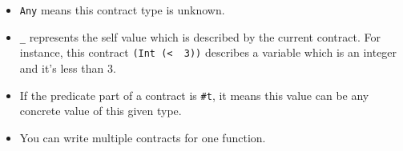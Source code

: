 \documentclass[paper=a4, fontsize=11pt]{scrartcl} %
\numberwithin{equation}{section} %
\numberwithin{figure}{section} %
\numberwithin{table}{section} %
\begin{document}
\begin{itemize}
\item \texttt{Any} means this contract type is unknown.

\item \texttt{_} represents the self value which is described by the current contract. For instance, this contract \texttt{(Int\ (\textless\ \underscore\ 3))} describes a variable which is an integer and it's less than 3.

\item If the predicate part of a contract is \texttt{\#t}, it means this value can be any concrete value of this given type.

\item You can write multiple contracts for one function.
\end{itemize}
\end{document}
